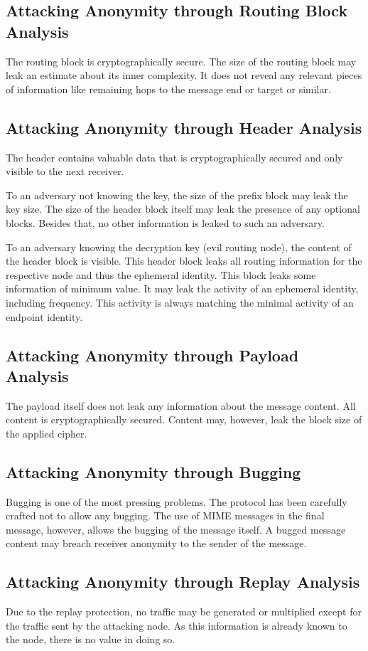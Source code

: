 \subsection{Attacking Anonymity through Routing Block Analysis}
The routing block is cryptographically secure. The size of the routing block may leak an estimate about its inner complexity. It does not reveal any relevant pieces of information like remaining hops to the message end or target or similar.

\subsection{Attacking Anonymity through Header Analysis}
The header contains valuable data that is cryptographically secured and only visible to the next receiver. 

To an adversary not knowing the key, the size of the prefix block may leak the key size. The size of the header block itself may leak the presence of any optional blocks. Besides that, no other information is leaked to such an adversary.

To an adversary knowing the decryption key (evil routing node), the content of the header block is visible. This header block leaks all routing information for the respective node and thus the ephemeral identity. This block leaks some information of minimum value. It may leak the activity of an ephemeral identity, including frequency. This activity is always matching the minimal activity of an endpoint identity. 

\subsection{Attacking Anonymity through Payload Analysis}
The payload itself does not leak any information about the message content. All content is cryptographically secured. Content may, however, leak the block size of the applied cipher.

\subsection{Attacking Anonymity through Bugging}
Bugging is one of the most pressing problems. The protocol has been carefully crafted not to allow any bugging. The use of MIME messages in the final message, however, allows the bugging of the message itself. A bugged message content may breach receiver anonymity to the sender of the message.

\subsection{Attacking Anonymity through Replay Analysis}
Due to the replay protection, no traffic may be generated or multiplied except for the traffic sent by the attacking node. As this information is already known to the node, there is no value in doing so. 

